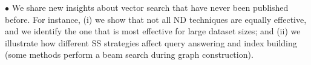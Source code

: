 







\noindent$\bullet$ We share new insights about vector search that have never been published before.
For instance, (i) we show that not all ND techniques are equally effective, and we identify the one that is most effective for large dataset sizes; and (ii) we illustrate how different SS strategies affect query answering and index building (some methods perform a beam search during graph construction).

